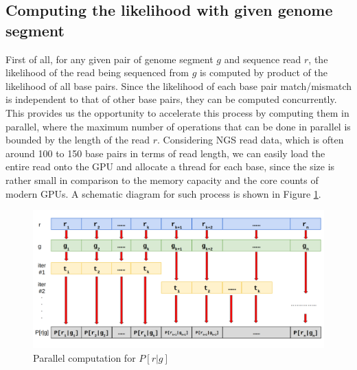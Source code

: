 \documentclass{PHlab-thesis}
\begin{document}
\subsection{Computing the likelihood with given genome segment}
First of all, for any given pair of genome segment $g$ and sequence read $r$, the likelihood of the read being sequenced from $g$ is computed by product of the likelihood of all base pairs. Since the likelihood of each base pair match/mismatch is independent to that of other base pairs, they can be computed concurrently. This provides us the opportunity to accelerate this process by computing them in parallel, where the maximum number of operations that can be done in parallel is bounded by the length of the read $r$. Considering NGS read data, which is often around 100 to 150 base pairs in terms of read length, we can easily load the entire read onto the GPU and allocate a thread for each base, since the size is rather small in comparison to the memory capacity and the core counts of modern GPUs. A schematic diagram for such process is shown in Figure \ref{fig:prg}.
\begin{figure}
	\centering
	\includegraphics[scale=0.3]{figures/method1.png}
	\caption{Parallel computation for $P[r|g]$}
	\label{fig:prg} %
\end{figure}
\end{document}
